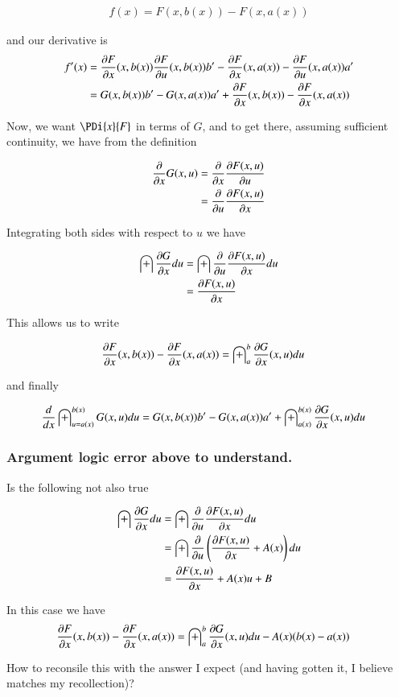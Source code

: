 \documentclass{article}
\begin{document}
\begin{align*}
f(x) = F(x,b(x)) - F(x,a(x))
\end{align*}

and our derivative is
\begin{align*}
f'(x)
&=
\PD{x}{F}(x,b(x))
\PD{u}{F}(x,b(x)) b'
-\PD{x}{F}(x,a(x))
-\PD{u}{F}(x,a(x)) a' \\
&=
G(x,b(x)) b'
-G(x,a(x)) a'
+\PD{x}{F}(x,b(x))
-\PD{x}{F}(x,a(x))
\\
\end{align*}

Now, we want $\PDi{x}{F}$ in terms of $G$, and to get there, assuming sufficient continuity, we have from the definition

\begin{align*}
\PD{x}{} G(x,u) 
&= \PD{x}{} \PD{u}{F(x,u)} \\
&= \PD{u}{} \PD{x}{F(x,u)} \\
\end{align*}

Integrating both sides with respect to $u$ we have

\begin{align*}
\int \PD{x}{G} du 
&= \int \PD{u}{} \PD{x}{F(x,u)} du \\
&= \PD{x}{F(x,u)} 
\end{align*}

This allows us to write 

\begin{align*}
\PD{x}{F}(x,b(x))
-\PD{x}{F}(x,a(x))
&=
\int_{a}^b \PD{x}{G}(x,u) du
\end{align*}

and finally

\begin{align}\label{eqn:diffInt}
\frac{d}{dx} \int_{u = a(x)}^{b(x)} G(x,u) du
&=
G(x,b(x)) b'
-G(x,a(x)) a'
+ \int_{a(x)}^{b(x)} \PD{x}{G}(x,u) du
\end{align}

\subsubsection{ Argument logic error above to understand. }

Is the following not also true

\begin{align*}
\int \PD{x}{G} du 
&= \int \PD{u}{} \PD{x}{F(x,u)} du \\
&= \int \PD{u}{} \left( \PD{x}{F(x,u)} + A(x) \right) du \\
&= \PD{x}{F(x,u)} + A(x)u + B
\end{align*}

In this case we have
\begin{align*}
\PD{x}{F}(x,b(x)) -\PD{x}{F}(x,a(x)) &= \int_{a}^b \PD{x}{G}(x,u) du - A(x) ( b(x) - a(x))
\end{align*}

How to reconsile this with the answer I expect (and having gotten it, I believe matches my recollection)?



\end{document}
